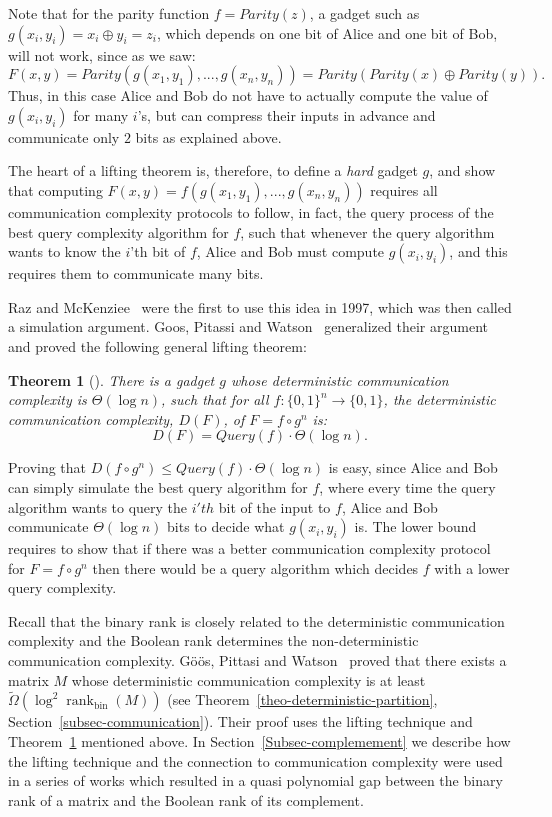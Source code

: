 \documentclass[11pt]{article}
\newtheorem{theorem}{Theorem}
\newcommand{\rank}{\mathop{\mathrm{rank}}}
\newcommand{\Rbin}{{\rank}_{\mathrm{bin}}}
\begin{document}
Note that for the parity function $f = Parity(z)$, a gadget such as $g(x_i,y_i) = x_i \oplus y_i = z_i$, which depends on one bit of Alice and one bit of Bob, will not work,
since as we saw:
$$F(x,y) = Parity(g(x_1,y_1),...,g(x_n,y_n)) = Parity(Parity(x) \oplus Parity(y)).$$
Thus, in this case Alice and Bob do not have to actually compute the value of  $g(x_i,y_i)$ for many $i$'s,
but can compress their inputs in advance and communicate only $2$ bits as explained above.

The heart of a lifting theorem is, therefore, to define a {\em hard} gadget $g$, and show that computing $F(x,y) = f(g(x_1,y_1),...,g(x_n,y_n))$
requires all communication complexity protocols to follow, in fact, the query process of the best query complexity algorithm for $f$,
such that whenever the query algorithm wants to know the $i$'th bit of $f$,
Alice and Bob must compute $g(x_i,y_i)$, and this requires them to communicate many bits.

Raz and McKenziee~\cite{RazM99} were the first to use this idea in 1997, which was then called a simulation argument.
Goos,  Pitassi and Watson~\cite{Goos} generalized their argument and proved the following general lifting theorem:

\begin{theorem}[\cite{goos2018deterministic}]
\label{theo-goos}
There is a gadget $g$ whose deterministic communication complexity is $\Theta(\log n)$, such that for all $f:\{0,1\}^n \rightarrow \{0,1\}$,
the deterministic communication complexity, $D(F)$, of $F = f\circ g^n$ is:
$$D(F) = Query(f) \cdot \Theta(\log n).$$
\end{theorem}
Proving that $D(f\circ g^n) \leq Query(f) \cdot \Theta(\log n)$ is easy, since Alice and Bob can simply simulate the best query algorithm for $f$,
where every time the query algorithm wants to query the $i'th$ bit of the input to $f$, Alice and Bob communicate $\Theta(\log n)$ bits to decide what $g(x_i,y_i)$ is.
The lower bound requires to show that if there was a better communication complexity protocol for $F = f\circ g^n$ then
there would be a query algorithm which decides $f$ with a lower query complexity.

Recall that the binary rank is closely related to the deterministic communication complexity and the Boolean rank determines the non-deterministic communication complexity.
G\"{o}\"{o}s, Pittasi and Watson~\cite{Goos} proved that there exists a matrix $M$ whose deterministic communication complexity is at least $\widetilde{\Omega}(\log^2 \Rbin(M))$
(see Theorem~\ref{theo-deterministic-partition}, Section~\ref{subsec-communication}). Their proof  uses the lifting technique and Theorem~\ref{theo-goos} mentioned above.
In Section~\ref{Subsec-complemement} we describe how the lifting technique and the connection to communication complexity were used in a series of works
which resulted in a quasi polynomial gap between the binary rank of a matrix and the Boolean rank of its complement.
\end{document}
